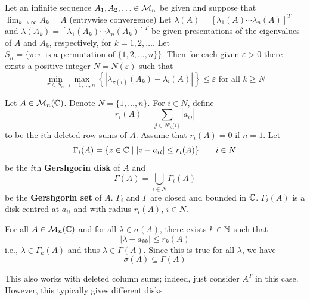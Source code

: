 \documentclass[aspectratio=169]{beamer}
\begin{document}
\begin{frame}
	\begin{theorem}
		\label{th:HJ_2_4_9_2}
		Let an infinite sequence $A_1,A_2,\ldots\in\mathcal{M}_n$ be given and suppose that $\lim_{k\to\infty} A_k = A$ (entrywise convergence)
		\vskip0.5cm
		Let $\lambda(A) = [\lambda_1(A)\cdots\lambda_n(A)]^T$ and $\lambda(A_k) = [\lambda_1(A_k)\cdots \lambda_n(A_k)]^T$ be given presentations of the eigenvalues of $A$ and $A_k$, respectively, for $k=1,2,\ldots$. Let $S_n = \{\pi : \pi\text{ is a permutation of }\{1,2,\ldots,n\}\}$. 
		Then for each given $\varepsilon>0$ there exists a positive integer $N = N(\varepsilon)$ such that
		\[
			\min_{\pi\in S_n}\max_{i=1,\ldots,n}\left\{|\lambda_{\pi(i)}(A_k)-\lambda_i(A)|\right\}\leq\varepsilon\text{ for all }k\geq N
		\]
	\end{theorem}
\end{frame}

\begin{frame}{\cite{Varga2010}}
	Let $A\in \mathcal{M}_n(\mathbb{C})$. Denote $N=\{1,\ldots,n\} $. For $i\in N$, define 
	\[r_i (A)= \sum\limits_{j\in N\setminus \{i\}} | a_{ij}|\]
	to be
	the $i$th deleted row sums of $A$. Assume that $r_i(A)=0$ if $n=1$. Let 
	\[\Gamma_i(A)=\{z\in \mathbb{C} \mid |z-a_{ii}|\leq r_i(A)\} \qquad i\in N\]
	 be the $i$th \textbf{Gershgorin disk} of $A$ and 
	\[\Gamma(A)= \bigcup\limits_{i\in N} \Gamma_i (A)\]
	be the \textbf{Gershgorin set} of $A$. $\Gamma_i$ and $\Gamma$ are closed and bounded in $\mathbb{C}$. $\Gamma_i(A)$ is a disk centred at $a_{ii}$ and with radius $r_i(A)$, $i\in N$.
\end{frame}
	
	
\begin{frame}
	\begin{theorem}[Gershgorin, 1931]
		\label{th:Gershgorin}
	For all $A\in \mathcal{M}_{n}(\mathbb{C})$ and for all $\lambda\in \sigma(A)$, there exists $k\in \mathbb{N}$ such that 
	\[
	  |\lambda -a_{kk}|\leq r_k(A)
	\]
	i.e., $\lambda\in \Gamma_k(A)$ and thus $\lambda \in \Gamma(A)$. Since this is true for all $\lambda$, we have 
	\[
	  \sigma(A)\subseteq \Gamma(A)
	\]
	\end{theorem}
	\vfill
	\begin{remark}
	This also works with deleted column sums; indeed, just consider $A^T$ in this case. However, this typically gives different disks
	\end{remark}
\end{frame}
\end{document}
